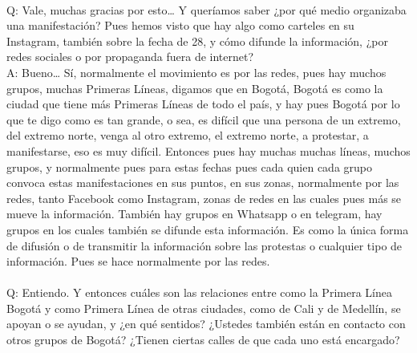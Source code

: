 \documentclass{phyasgn}\usepackage{nag}
\begin{document}
\\
Q: Vale, muchas gracias por esto… Y queríamos saber ¿por qué medio organizaba una manifestación? Pues hemos visto que hay algo como carteles en su Instagram, también sobre la fecha de 28, y cómo difunde la información, ¿por redes sociales o por propaganda fuera de internet?\\
A: Bueno… Sí, normalmente el movimiento es por las redes, pues hay muchos grupos, muchas Primeras Líneas, digamos que en Bogotá, Bogotá es como la ciudad que tiene más Primeras Líneas de todo el país, y hay pues Bogotá por lo que te digo como es tan grande, o sea, es difícil que una persona de un extremo, del extremo norte, venga al otro extremo, el extremo norte, a protestar, a manifestarse, eso es muy difícil. Entonces pues hay muchas muchas líneas, muchos grupos, y normalmente pues para estas fechas pues cada quien cada grupo convoca estas manifestaciones en sus puntos, en sus zonas, normalmente por las redes, tanto Facebook como Instagram, zonas de redes en las cuales pues más se mueve la información. También hay grupos en Whatsapp o en telegram, hay grupos en los cuales también se difunde esta información. Es como la única forma de difusión o de transmitir la información sobre las protestas o cualquier tipo de información. Pues se hace normalmente por las redes. \\
\\
Q: Entiendo. Y entonces cuáles son las relaciones entre como la Primera Línea Bogotá y como Primera Línea de otras ciudades, como de Cali y de Medellín, se apoyan o se ayudan, y ¿en qué sentidos? ¿Ustedes también están en contacto con otros grupos de Bogotá? ¿Tienen ciertas calles de que cada uno está encargado? \\
\end{document}
